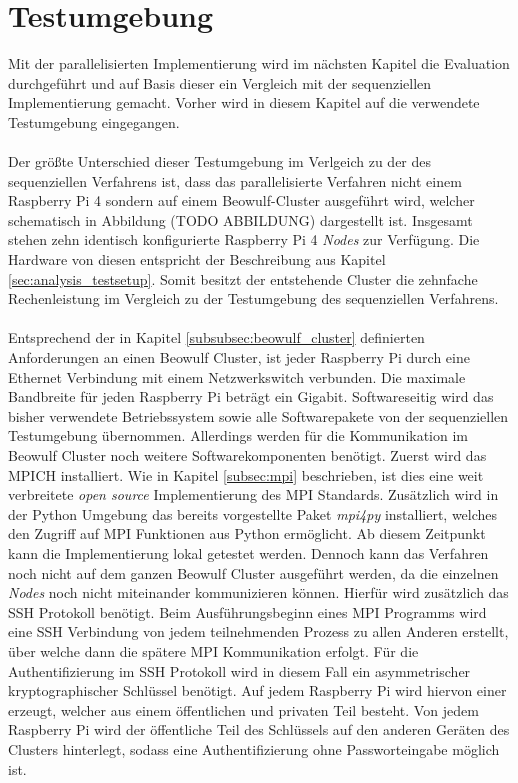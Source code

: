\section{Testumgebung} %
Mit der parallelisierten Implementierung wird im nächsten Kapitel die Evaluation durchgeführt und auf Basis dieser ein Vergleich mit der sequenziellen Implementierung gemacht. Vorher wird in diesem Kapitel auf die verwendete Testumgebung eingegangen. 
\\\\
Der größte Unterschied dieser Testumgebung im Verlgeich zu der des sequenziellen Verfahrens ist, dass das parallelisierte Verfahren nicht einem Raspberry Pi 4 sondern auf einem Beowulf-Cluster ausgeführt wird, welcher schematisch in Abbildung (TODO ABBILDUNG) dargestellt ist. Insgesamt stehen zehn identisch konfigurierte Raspberry Pi 4 \emph{Nodes} zur Verfügung. Die Hardware von diesen entspricht der Beschreibung aus Kapitel \ref{sec:analysis_testsetup}. Somit besitzt der entstehende Cluster die zehnfache Rechenleistung im Vergleich zu der Testumgebung des sequenziellen Verfahrens.
\\\\
Entsprechend  der in Kapitel \ref{subsubsec:beowulf_cluster} definierten Anforderungen an einen Beowulf Cluster, ist jeder Raspberry Pi durch eine Ethernet Verbindung mit einem Netzwerkswitch verbunden. Die maximale Bandbreite für jeden Raspberry Pi beträgt ein Gigabit. Softwareseitig wird das bisher verwendete Betriebssystem sowie alle Softwarepakete von der sequenziellen Testumgebung übernommen. Allerdings werden für die Kommunikation im Beowulf Cluster noch weitere Softwarekomponenten benötigt. Zuerst wird das MPICH installiert. Wie in Kapitel \ref{subsec:mpi} beschrieben, ist dies eine weit verbreitete \emph{open source} Implementierung des \ac{MPI} Standards. Zusätzlich wird in der Python Umgebung das bereits vorgestellte Paket \emph{mpi4py} installiert, welches den Zugriff auf \ac{MPI} Funktionen aus Python ermöglicht. Ab diesem Zeitpunkt kann die Implementierung lokal getestet werden. Dennoch kann das Verfahren noch nicht auf dem ganzen Beowulf Cluster ausgeführt werden, da die einzelnen \emph{Nodes} noch nicht miteinander kommunizieren können. Hierfür wird zusätzlich das \ac{SSH} Protokoll benötigt. Beim Ausführungsbeginn eines \ac{MPI} Programms wird eine \ac{SSH} Verbindung von jedem teilnehmenden Prozess zu allen Anderen erstellt, über welche dann die spätere \ac{MPI} Kommunikation erfolgt. Für die Authentifizierung im \ac{SSH} Protokoll wird in diesem Fall ein asymmetrischer kryptographischer Schlüssel benötigt. Auf jedem Raspberry Pi wird hiervon einer erzeugt, welcher aus einem öffentlichen und privaten Teil besteht. Von jedem Raspberry Pi wird der öffentliche Teil des Schlüssels auf den anderen Geräten des Clusters hinterlegt, sodass eine Authentifizierung ohne Passworteingabe möglich ist.
